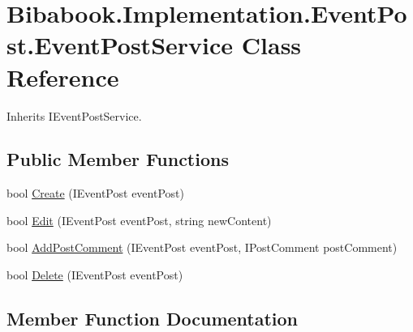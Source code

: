 \hypertarget{class_bibabook_1_1_implementation_1_1_event_post_1_1_event_post_service}{}\section{Bibabook.\+Implementation.\+Event\+Post.\+Event\+Post\+Service Class Reference}
\label{class_bibabook_1_1_implementation_1_1_event_post_1_1_event_post_service}


Inherits I\+Event\+Post\+Service.

\subsection*{Public Member Functions}
\begin{DoxyCompactItemize}
\item 
bool \hyperlink{class_bibabook_1_1_implementation_1_1_event_post_1_1_event_post_service_ad2657b93d677033ccdbf2957281e0ea1}{Create} (I\+Event\+Post event\+Post)
\item 
bool \hyperlink{class_bibabook_1_1_implementation_1_1_event_post_1_1_event_post_service_afd957411d2f00bfc798f3647e17d878c}{Edit} (I\+Event\+Post event\+Post, string new\+Content)
\item 
bool \hyperlink{class_bibabook_1_1_implementation_1_1_event_post_1_1_event_post_service_afcfcf99aa0a6a13868479ba42526a534}{Add\+Post\+Comment} (I\+Event\+Post event\+Post, I\+Post\+Comment post\+Comment)
\item 
bool \hyperlink{class_bibabook_1_1_implementation_1_1_event_post_1_1_event_post_service_a540d3592cb666ebc10f1f9a36a80269c}{Delete} (I\+Event\+Post event\+Post)
\end{DoxyCompactItemize}


\subsection{Member Function Documentation}
\hypertarget{class_bibabook_1_1_implementation_1_1_event_post_1_1_event_post_service_afcfcf99aa0a6a13868479ba42526a534}{}
